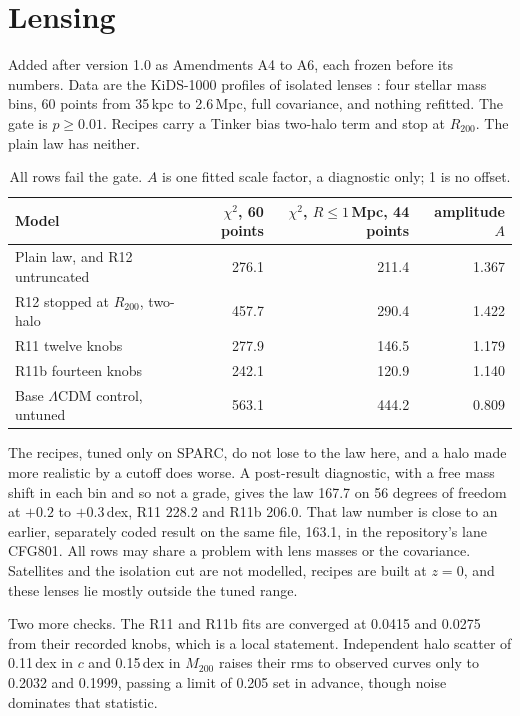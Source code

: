 \documentclass[11pt]{article}
\begin{document}
\section{Lensing}
Added after version 1.0 as Amendments A4 to A6, each frozen before its numbers. Data are the KiDS-1000 profiles of isolated lenses \cite{brouwer21}: four stellar mass bins, 60 points from 35\,kpc to 2.6\,Mpc, full covariance, and nothing refitted. The gate is $p\ge0.01$. Recipes carry a Tinker bias \cite{tinker10} two-halo term and stop at $R_{200}$. The plain law has neither.
\begin{table}[h]\centering\small
\begin{tabular}{lrrr}
\toprule
Model & $\chi^2$, 60 points & $\chi^2$, $R\le1$\,Mpc, 44 points & amplitude $A$\\
\midrule
Plain law, and R12 untruncated & 276.1 & 211.4 & 1.367\\
R12 stopped at $R_{200}$, two-halo & 457.7 & 290.4 & 1.422\\
R11 twelve knobs & 277.9 & 146.5 & 1.179\\
R11b fourteen knobs & 242.1 & 120.9 & 1.140\\
Base $\Lambda$CDM control, untuned & 563.1 & 444.2 & 0.809\\
\bottomrule
\end{tabular}
\caption{All rows fail the gate. $A$ is one fitted scale factor, a diagnostic only; 1 is no offset.}
\end{table}
The recipes, tuned only on SPARC, do not lose to the law here, and a halo made more realistic by a cutoff does worse. A post-result diagnostic, with a free mass shift in each bin and so not a grade, gives the law 167.7 on 56 degrees of freedom at $+0.2$ to $+0.3$\,dex, R11 228.2 and R11b 206.0. That law number is close to an earlier, separately coded result on the same file, 163.1, in the repository's lane CFG801. All rows may share a problem with lens masses or the covariance. Satellites and the isolation cut are not modelled, recipes are built at $z=0$, and these lenses lie mostly outside the tuned range.

Two more checks. The R11 and R11b fits are converged at 0.0415 and 0.0275 from their recorded knobs, which is a local statement. Independent halo scatter of 0.11\,dex in $c$ and 0.15\,dex in $M_{200}$ raises their rms to observed curves only to 0.2032 and 0.1999, passing a limit of 0.205 set in advance, though noise dominates that statistic.
\end{document}

